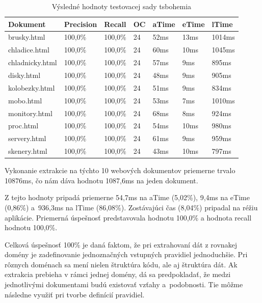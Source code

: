 \begin{table}[hbt]
\caption{Výsledné hodnoty testovacej sady tsbohemia}
\centering
\begin{tabular}{|l|l|l|l|l|l|l|}
\hline
\textbf{Dokument}          & \textbf{Precision} & \textbf{Recall}  & \textbf{OC}  & \textbf{aTime} & \textbf{eTime} & \textbf{lTime}  \\ \hline
brusky.html     & 100,0\%   & 100,0\% & 24 & 52ms  & 13ms  & 1014ms \\ \hline
chladice.html   & 100,0\%   & 100,0\% & 24 & 60ms  & 10ms  & 1045ms \\ \hline
chladnicky.html & 100,0\%   & 100,0\% & 24 & 57ms  & 9ms   & 895ms  \\ \hline
disky.html      & 100,0\%   & 100,0\% & 24 & 48ms  & 9ms   & 905ms  \\ \hline
kolobezky.html  & 100,0\%   & 100,0\% & 24 & 51ms  & 9ms   & 834ms  \\ \hline
mobo.html       & 100,0\%   & 100,0\% & 24 & 53ms  & 7ms   & 1010ms \\ \hline
monitory.html   & 100,0\%   & 100,0\% & 24 & 68ms  & 8ms   & 924ms  \\ \hline
proc.html       & 100,0\%   & 100,0\% & 24 & 54ms  & 10ms  & 980ms  \\ \hline
servery.html    & 100,0\%   & 100,0\% & 24 & 61ms  & 9ms   & 959ms  \\ \hline
skenery.html    & 100,0\%   & 100,0\% & 24 & 43ms  & 10ms  & 797ms  \\ \hline
\end{tabular}
\end{table}

Vykonanie extrakcie na týchto 10 webových dokumentov priemerne trvalo 10876ms, čo nám dáva hodnotu 1087,6ms na jeden dokument. 

Z tejto hodnoty pripadá priemerne 54,7ms na aTime (5,02\%), 9,4ms na eTime (0,86\%) a~936,3ms na lTime (86,08\%). Zostávajúci čas (8,04\%) pripadal na réžiu aplikácie. Priemerná úspešnosť predstavovala hodnotu 100,0\% a hodnota recall hodnotu 100,0\%. 

\bigskip

Celková úspešnosť 100\% je daná faktom, že pri extrahovaní dát z rovnakej domény je zadefinovanie jednoznačných vstupných pravidiel jednoduchšie. Pri rôznych doménach sa mení nielen štruktúra kódu, ale aj štruktúra dát. Ak extrakcia prebieha v rámci jednej domény, dá sa predpokladať, že medzi jednotlivými dokumentami budú existovať vzťahy a~podobnosti. Tie môžme následne využiť pri tvorbe definícií pravidiel.

